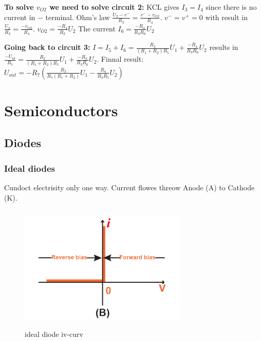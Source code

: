 \documentclass{article}
\begin{document}
\textbf{To solve $v_{O2}$ we need to solve circuit 2:} \newline
KCL gives $I_3=I_4$ since there is no current in $-$ terminal. \newline
Ohm's law $\frac{U_2-v^-}{R_3}=\frac{v^--v_{O2}}{R_4}$. \newline
$v^-=v^+=0$ with result in $\frac{U_2}{R_3}=\frac{-v_{O2}}{R_4}$. \newline
$v_{O2}=\frac{-R_4}{R_3}U_2$ \newline
The current $I_6=\frac{-R_4}{R_3R_6}U_2$ \newline
\vspace{3mm}

\textbf{Going back to circuit 3:} \newline
$I=I_5+I_6=\frac{R_2}{(R_1+R_2)R_5}U_1+\frac{-R_4}{R_3R_6}U_2$ \newline
results in $\frac{-U_{ut}}{R_7}=\frac{R_2}{(R_1+R_2)R_5}U_1+\frac{-R_4}{R_3R_6}U_2$. \newline
Finnal result: $U_{out}=-R_7(\frac{R_2}{R_5(R_1+R_2)}U_1-\frac{R_4}{R_3R_5}U_2)$

\newpage
\section{Semiconductors}
\subsection{Diodes}
\subsubsection{Ideal diodes}
Cundoct electrisity only one way. Current flowes threow Anode (A) to Cathode (K).
\begin{figure}[h]
    \centering
    \includegraphics[width=8cm, height=6cm]{image/ideal-diode.jpg}
    \caption{ideal diode iv-curv}
\end{figure}
\end{document}

